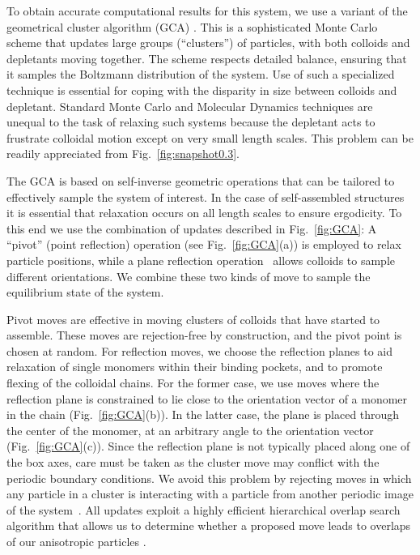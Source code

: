 \documentclass[8.5pt,oneside,onecolumn]{article}
\begin{document}
To obtain accurate computational results for this system, we use a
variant of the geometrical cluster algorithm (GCA) \cite{Liu2004}.
This is a sophisticated Monte Carlo scheme that 
 updates large groups (``clusters'') of
particles, with both colloids and depletants moving together.  
The scheme respects detailed balance, ensuring that it samples the
Boltzmann distribution of the system.  Use of
such a specialized technique is essential for coping with the
disparity in size between colloids and depletant.  Standard Monte
Carlo and Molecular Dynamics techniques are unequal to the task of
relaxing such systems because the depletant acts to frustrate
colloidal motion except on very small length scales. This problem can
be readily appreciated from Fig.~\ref{fig:snapshot0.3}.


The GCA is based on self-inverse geometric operations that can be
tailored to effectively sample the system of interest.  In the case of
self-assembled structures it is essential that relaxation occurs on
all length scales to ensure ergodicity. To this end we use the
combination of updates described in Fig.~\ref{fig:GCA}: A ``pivot''
(point reflection) operation (see Fig.~\ref{fig:GCA}(a)) is employed to
relax particle positions, while a plane reflection
operation~\cite{sinkovits:144111} allows colloids to sample different
orientations.  We combine these two kinds of move to sample the equilibrium
state of the system.  

Pivot moves 
are  effective in
moving clusters of colloids that have started to assemble.
These moves are rejection-free by construction, and the pivot
point is chosen at random.
For reflection moves, we choose the reflection planes to
aid relaxation of single monomers within their binding pockets, and to
promote flexing of the colloidal chains.  For the former case, we use moves where 
the reflection plane is constrained to lie close to the orientation vector of a monomer in the
chain (Fig.~\ref{fig:GCA}(b)). In the latter case, the 
plane is placed through the center of the monomer,
at an arbitrary angle to the orientation vector (Fig.~\ref{fig:GCA}(c)). 
Since the reflection plane is not typically placed along
one of the box axes, care must be taken as the cluster move may
conflict with the periodic boundary conditions. We avoid this problem by rejecting moves in which
any particle in a cluster is interacting with a particle from another
periodic image of the system~\cite{sinkovits:144111}.
%  
All
updates exploit a highly efficient hierarchical overlap search
algorithm that allows us to determine whether a proposed move leads to
overlaps of our anisotropic particles
\cite{Marechal:2010fk,He:1990kx,Cinacchi:2010uq}.
\end{document}
